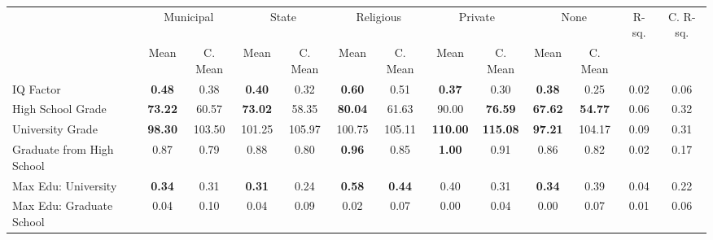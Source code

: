 \begin{tabular}{l c c c c c c c c c c c c}
\toprule
& \multicolumn{2}{c}{Municipal} & \multicolumn{2}{c}{State} & \multicolumn{2}{c}{Religious} & \multicolumn{2}{c}{Private} & \multicolumn{2}{c}{None} & R-sq. & C. R-sq. \\
& \scriptsize Mean & \scriptsize C. Mean & \scriptsize Mean & \scriptsize C. Mean & \scriptsize Mean & \scriptsize C. Mean & \scriptsize Mean & \scriptsize C. Mean & \scriptsize Mean & \scriptsize C. Mean & & \\
\midrule
IQ Factor & \textbf{     0.48} & 0.38 & \textbf{     0.40} & 0.32 & \textbf{     0.60} & 0.51 & \textbf{     0.37} & 0.30 & \textbf{     0.38} & 0.25 &      0.02 &      0.06 \\
High School Grade & \textbf{    73.22} & 60.57 & \textbf{    73.02} & 58.35 & \textbf{    80.04} & 61.63 &     90.00 & \textbf{    76.59} & \textbf{    67.62} & \textbf{    54.77} &      0.06 &      0.32 \\
University Grade & \textbf{    98.30} & 103.50 &    101.25 & 105.97 &    100.75 & 105.11 & \textbf{   110.00} & \textbf{   115.08} & \textbf{    97.21} & 104.17 &      0.09 &      0.31 \\
Graduate from High School &      0.87 & 0.79 &      0.88 & 0.80 & \textbf{     0.96} & 0.85 & \textbf{     1.00} & 0.91 &      0.86 & 0.82 &      0.02 &      0.17 \\
Max Edu: University & \textbf{     0.34} & 0.31 & \textbf{     0.31} & 0.24 & \textbf{     0.58} & \textbf{     0.44} &      0.40 & 0.31 & \textbf{     0.34} & 0.39 &      0.04 &      0.22 \\
Max Edu: Graduate School &      0.04 & 0.10 &      0.04 & 0.09 &      0.02 & 0.07 &      0.00 & 0.04 &      0.00 & 0.07 &      0.01 &      0.06 \\
\bottomrule
\end{tabular}
